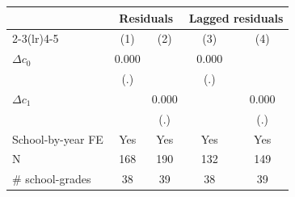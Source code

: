 {
\def\sym#1{\ifmmode^{#1}\else\(^{#1}\)\fi}
\begin{tabular}{l*{4}{c}}
\hline\hline
                    &\multicolumn{2}{c}{Residuals}              &\multicolumn{2}{c}{Lagged residuals}       \\\cmidrule(lr){2-3}\cmidrule(lr){4-5}
                    &\multicolumn{1}{c}{(1)}         &\multicolumn{1}{c}{(2)}         &\multicolumn{1}{c}{(3)}         &\multicolumn{1}{c}{(4)}         \\
\hline
$\Delta c_0$        &       0.000         &                     &       0.000         &                     \\
                    &         (.)         &                     &         (.)         &                     \\
$\Delta c_1$        &                     &       0.000         &                     &       0.000         \\
                    &                     &         (.)         &                     &         (.)         \\
School-by-year FE   &         Yes         &         Yes         &         Yes         &         Yes         \\
\hline
N                   &         168         &         190         &         132         &         149         \\
\# school-grades    &          38         &          39         &          38         &          39         \\
\hline\hline
\end{tabular}
}
